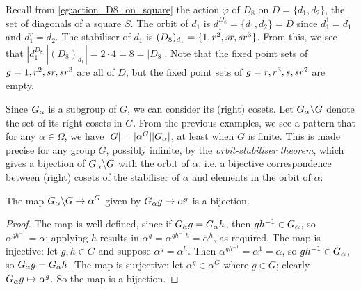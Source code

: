 \begin{example}\label{eg:D8_diagonals_orbits_stabilisers}
    Recall from \autoref{eg:action_D8_on_square} the action $\varphi$ of $D_8$ on $D = \{d_1,d_2\}$, the set of diagonals of a square $S$. The orbit of $d_1$ is $d_1^{D_8} = \{d_1,d_2\} = D$ since $d_1^1 = d_1$ and $d_1^r = d_2$. The stabiliser of $d_1$ is $(D_8)_{d_1} = \{1,r^2,\added{2}{sr,sr^3}\}$. From this, we see that $|d_1^{D_8}| |(D_8)_{d_1}| = 2 \cdot 4 = 8 = |D_8|$. Note that the fixed point sets of $g = 1,r^2,\added{2}{sr,sr^3}$ are all of $D$, but the fixed point sets of $g = r,r^3,s,\added{2}{sr^2}$ are empty.
\end{example}

Since $\added{2}{G_\alpha}$ is a subgroup of $G$, we can consider its (right) cosets. Let $\added{2}{G_\alpha} \backslash G$ denote the set of its right cosets in $G$. From the previous examples, we see a pattern that for any $\alpha \in \Omega$, we have $|G| = |\alpha^G| |\added{2}{G_\alpha}|$, at least when $G$ is finite. This is made precise for any group $G$, possibly infinite, by the \textit{orbit-stabiliser theorem}, which gives a bijection of $\added{2}{G_\alpha} \backslash G$ with the orbit of $\alpha$, i.e. a bijective correspondence between (right) cosets of the stabiliser of $\alpha$ and elements in the orbit of $\alpha$:

\begin{theorem}\label{thm:orbit_stabiliser}
     The map $\added{2}{G_\alpha} \backslash G \to \alpha^G$ given by $\added{2}{G_\alpha}g \mapsto \alpha^g$ is a bijection. 
\end{theorem}

\begin{proof}
    The map is well-defined, since if $\added{2}{G_\alpha}g = \added{2}{G_\alpha}h$, then $gh^{-1} \in \added{2}{G_\alpha}$, so $\alpha^{gh^{-1}} = \alpha$; applying $h$ results in $\alpha^g = \alpha^{gh^{-1}h} = \alpha^h$, as required. The map is injective: let $g,h \in G$ and suppose $\alpha^g = \alpha^h$. Then $\alpha^{gh^{-1}} = \alpha^1 = \alpha$, so $gh^{-1} \in \added{2}{G_\alpha}$, so $\added{2}{G_\alpha}g = \added{2}{G_\alpha}h$. The map is surjective: let $\alpha^g \in \alpha^G$ where $g \in G$; clearly $\added{2}{G_\alpha}g \mapsto \alpha^g$. So the map is a bijection.
\end{proof}

